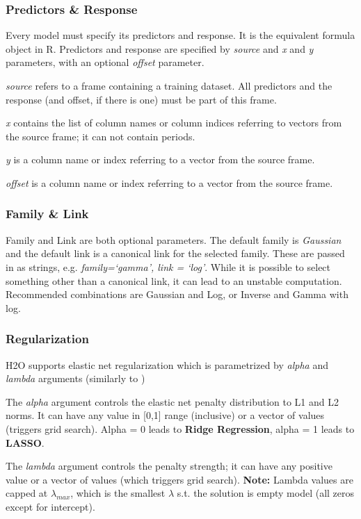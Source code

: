 \documentclass[11pt]{article}
\begin{document}
\subsubsection{Predictors \& Response}
Every model must specify its predictors and response. It is the equivalent formula object in R. Predictors and response are specified by \textit{source} and \textit{x} and \textit{y} parameters, with an optional \textit{offset} parameter. 

\textit{source} refers to a frame containing a training dataset. All predictors and the response (and offset, if there is one) must be part of this frame.

\textit{x} contains the list of column names or column indices referring to vectors from the source frame; it can not contain periods.

\textit{y} is a column name or index referring to a vector from the source frame.

\textit{offset} is a column name or index referring to a vector from the source frame.
  
\subsubsection{Family \& Link}
Family and Link are both optional parameters. The default family is \textit{Gaussian} and the default link is a canonical link for the selected family. These are passed in as strings, e.g. \textit{family=`gamma', link = `log'}.
While it is possible to select something other than a canonical link, it can lead to an unstable computation. Recommended combinations are Gaussian and Log, or Inverse and Gamma with log.  

\subsubsection{Regularization}

H2O supports elastic net regularization which is parametrized by \textit{alpha} and \textit{lambda} arguments (similarly to \cite{glmnet})

The \textit{alpha} argument controls the elastic net penalty distribution to L1 and L2 norms. It can have any value in [0,1] range (inclusive) or a vector of values (triggers grid search). Alpha = 0 leads to \textbf{Ridge Regression}, alpha = 1 leads to \textbf{LASSO}.  

The \textit{lambda} argument controls the penalty strength; it can have any positive value or a vector of values (which triggers grid search).
\textbf{Note:} Lambda values are capped at $\lambda_{max}$, which is the smallest $\lambda$ s.t. the solution is empty model (all zeros except for intercept).
\end{document}
